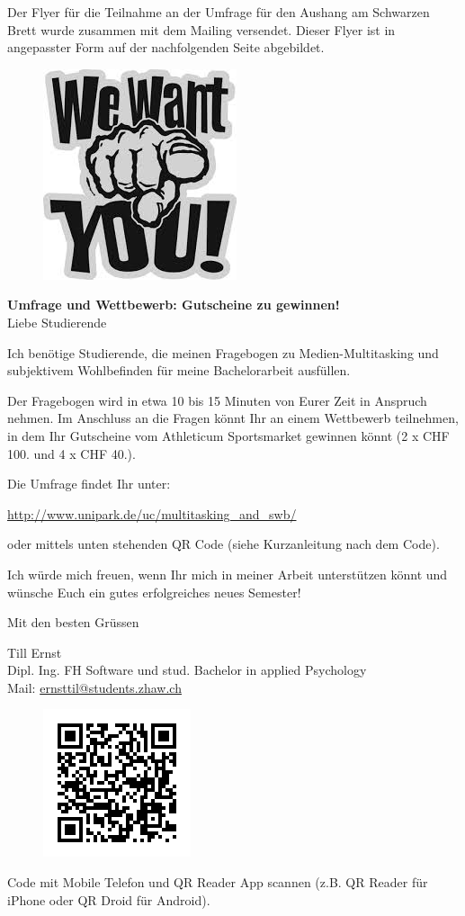 \begin{RaggedRight}
Der Flyer für die Teilnahme an der Umfrage für den Aushang am Schwarzen Brett wurde zusammen mit dem Mailing versendet. Dieser Flyer ist in angepasster Form auf der nachfolgenden Seite abgebildet. \newpage
\begin{figure}[h]
    \centering
    \includegraphics[scale=0.5]{images/anhang/WeWantYou.jpeg}
\end{figure}
\textbf{Umfrage und Wettbewerb: Gutscheine zu gewinnen!}\\
Liebe Studierende

Ich benötige Studierende, die meinen Fragebogen zu Medien-Multitasking und subjektivem Wohlbefinden für meine Bachelorarbeit ausfüllen.

Der Fragebogen wird in etwa 10 bis 15 Minuten von Eurer Zeit in Anspruch nehmen. Im Anschluss an die Fragen könnt Ihr an einem Wettbewerb teilnehmen, in dem Ihr Gutscheine vom Athleticum Sportsmarket gewinnen könnt (2 x CHF 100.­ und 4 x CHF 40.­).

Die Umfrage findet Ihr unter:

\url{http://www.unipark.de/uc/multitasking_and_swb/}

oder mittels unten stehenden QR Code (siehe Kurzanleitung nach dem Code).

Ich würde mich freuen, wenn Ihr mich in meiner Arbeit unterstützen könnt und wünsche Euch ein gutes erfolgreiches neues Semester!

Mit den besten Grüssen

Till Ernst\\
Dipl. Ing. FH Software und stud. Bachelor in applied Psychology\\
Mail: \href{mailto:ernsttil@students.zhaw.ch}{ernsttil@students.zhaw.ch}\\
\begin{figure}[h]
    \centering
    \includegraphics[scale=0.5]{images/anhang/umfrage_qr_code.png}
\end{figure}
Code mit Mobile ­Telefon und QR ­Reader ­App scannen (z.B. QR Reader für iPhone oder QR Droid für Android).
\end{RaggedRight}
